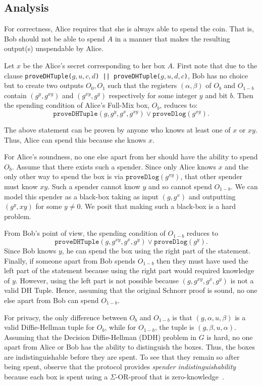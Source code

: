 \documentclass[runningheads]{llncs}
\begin{document}
\subsection{Analysis}

For correctness, Alice requires that she is always able to spend the coin. That is, Bob should not be able to spend $A$ in a manner that makes the resulting output(s) unspendable by Alice.

Let $x$ be the Alice's secret corresponding to her box $A$. First note that due to the clause 
\texttt{proveDHTuple($g, u, c, d$) || proveDHTuple($g, u, d, c$)}, Bob has no choice but to create two outputs $O_0, O_1$ such that the registers $(\alpha, \beta)$ of $O_b$ and $O_{1-b}$ contain $(g^y, g^{xy})$ and $(g^{xy}, g^y)$ respectively for some integer $y$ and bit $b$. Then the spending condition of Alice's Full-Mix box, $O_b$, reduces to:
$$\texttt{proveDHTuple}(g, g^{y}, g^x, g^{xy}) \lor \texttt{proveDlog}(g^{xy}).$$ 

The above statement can be proven by anyone who knows at least one of $x$ or $xy$. 
Thus, Alice can spend this because she knows $x$. 

For Alice's soundness, no one else apart from her should have the ability to spend $O_b$. Assume that there exists such a spender. Since only Alice knows $x$ and the only other way to spend the box is via $\texttt{proveDlog}(g^{xy})$, that other spender must know $xy$. Such a spender cannot know $y$ and so cannot spend $O_{1-b}$. We can model this spender as a black-box taking as input $(g, g^x)$ and outputting $(g^y, xy)$ for some $y\neq 0$. We posit that making such a black-box is a hard problem.

From Bob's point of view, the spending condition of $O_{1-b}$ reduces to 
$$\texttt{proveDHTuple}(g, g^{xy}, g^x, g^{y}) \lor \texttt{proveDlog}(g^{y}).$$
Since Bob knows $y$, he can spend the box using the right part of the statement. Finally, if someone apart from Bob spends $O_{1-b}$ then they must have used the left part of the statement because using the right part would required knowledge of $y$. However, using the left part is not possible because $(g, g^{xy}, g^x, g^{y})$ is not a valid DH Tuple. Hence, assuming that the original Schnorr proof is sound, no one else apart from Bob can spend $O_{1-b}$.

For privacy, the only difference between $O_b$ and $O_{1-b}$ is that $(g, \alpha, u, \beta)$ is a valid Diffie-Hellman tuple for $O_b$, while for $O_{1-b}$, the tuple is $(g, \beta, u, \alpha)$. Assuming that the Decision Diffie-Hellman (DDH) problem in $G$ is hard, no one apart from Alice or Bob has the ability to distinguish the boxes.
Thus, the boxes are indistinguishable before they are spent. To see that they remain so after being spent, observe that the protocol provides {\em spender indistinguishability} because each box is spent using a $\Sigma$-OR-proof that is zero-knowledge~\cite{Dam10}. 
\end{document}

